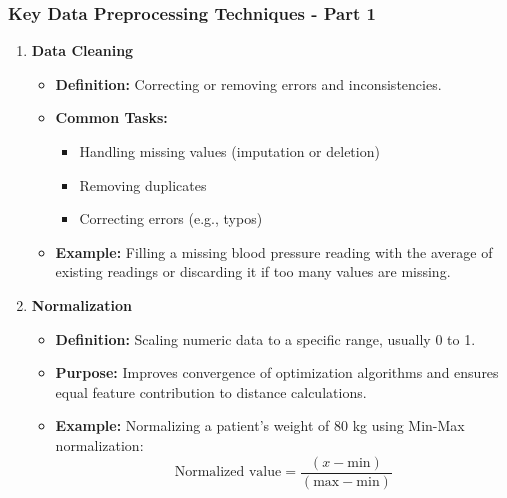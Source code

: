 \documentclass{beamer}
\begin{document}
\begin{frame}[fragile]
    \frametitle{Key Data Preprocessing Techniques - Part 1}
    
    \begin{enumerate}
        \item \textbf{Data Cleaning}
            \begin{itemize}
                \item \textbf{Definition:} Correcting or removing errors and inconsistencies.
                \item \textbf{Common Tasks:}
                    \begin{itemize}
                        \item Handling missing values (imputation or deletion)
                        \item Removing duplicates
                        \item Correcting errors (e.g., typos)
                    \end{itemize}
                \item \textbf{Example:} Filling a missing blood pressure reading with the average of existing readings or discarding it if too many values are missing.
            \end{itemize}
        
        \item \textbf{Normalization}
            \begin{itemize}
                \item \textbf{Definition:} Scaling numeric data to a specific range, usually 0 to 1.
                \item \textbf{Purpose:} Improves convergence of optimization algorithms and ensures equal feature contribution to distance calculations.
                \item \textbf{Example:} Normalizing a patient's weight of 80 kg using Min-Max normalization:
                \begin{equation}
                \text{Normalized value} = \frac{(x - \text{min})}{(\text{max} - \text{min})}
                \end{equation}
            \end{itemize}
    \end{enumerate}
\end{frame}
\end{document}
